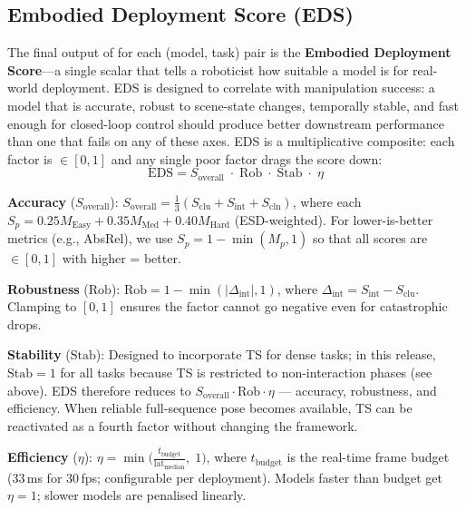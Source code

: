 \subsection{Embodied Deployment Score (EDS)}
\label{sec:eds}

The final output of \coolname{} for each (model, task) pair is the \textbf{Embodied Deployment Score}---a single scalar that tells a roboticist how suitable a model is for real-world deployment.
EDS is designed to correlate with manipulation success: a model that is accurate, robust to scene-state changes, temporally stable, and fast enough for closed-loop control should produce better downstream performance than one that fails on any of these axes.
EDS is a multiplicative composite: each factor is $\in [0,1]$ and any single poor factor drags the score down:
\[
\text{EDS} = S_\text{overall} \;\cdot\; \text{Rob} \;\cdot\; \text{Stab} \;\cdot\; \eta
\]

\textbf{Accuracy} ($S_\text{overall}$):
$S_\text{overall} = \frac{1}{3}(S_{\text{clu}} + S_{\text{int}} + S_{\text{cln}})$, where each $S_p = 0.25 M_\text{Easy} + 0.35 M_\text{Med} + 0.40 M_\text{Hard}$ (ESD-weighted).
For lower-is-better metrics (e.g., AbsRel), we use $S_p = 1 - \min(M_p, 1)$ so that all scores are $\in [0,1]$ with higher = better.

\textbf{Robustness} ($\text{Rob}$):
$\text{Rob} = 1 - \min(|\Delta_\text{int}|, 1)$, where $\Delta_\text{int} = S_{\text{int}} - S_{\text{clu}}$.
Clamping to $[0,1]$ ensures the factor cannot go negative even for catastrophic drops.

\textbf{Stability} ($\text{Stab}$):
Designed to incorporate TS for dense tasks; in this release, $\text{Stab} = 1$ for all tasks because TS is restricted to non-interaction phases (see above).
EDS therefore reduces to $S_\text{overall} \cdot \text{Rob} \cdot \eta$ --- accuracy, robustness, and efficiency.
When reliable full-sequence pose becomes available, TS can be reactivated as a fourth factor without changing the framework.

\textbf{Efficiency} ($\eta$):
$\eta = \min\!\big(\frac{t_\text{budget}}{\text{lat}_\text{median}},\; 1\big)$,
where $t_\text{budget}$ is the real-time frame budget (33\,ms for 30\,fps; configurable per deployment).
Models faster than budget get $\eta = 1$; slower models are penalised linearly.

